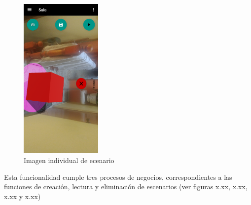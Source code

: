 \begin{figure}[h!]
	\centering
	\includegraphics[width=4cm,height=8cm]{imagenes/desarrollo/app/camera01.png}
	\caption{Imagen individual de ecenario}
	\label{fig:recover}
\end{figure}

Esta funcionalidad cumple tres procesos de negocios, correspondientes a las funciones de creación, lectura y eliminación de escenarios (ver figuras x.xx, x.xx, x.xx y x.xx)

